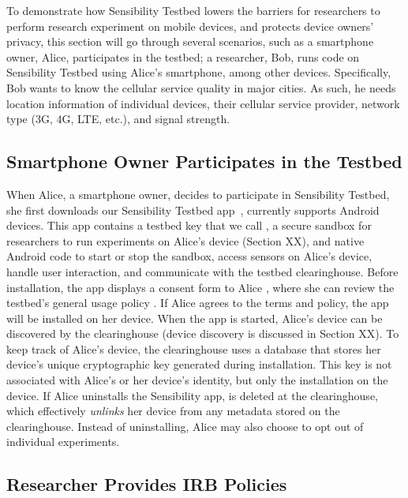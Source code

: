 To demonstrate how Sensibility Testbed lowers the barriers for
researchers to perform research experiment on mobile devices,
and protects device owners' privacy, this section will go
through several scenarios, such as a smartphone owner, Alice,
participates in the testbed; a researcher, Bob, runs code on
Sensibility Testbed using Alice's smartphone, among other
devices. Specifically, Bob wants to know the cellular service
quality in major cities. As such, he needs location information
of individual devices, their cellular service provider, network
type (3G, 4G, LTE, etc.), and signal strength.

\subsection{Smartphone Owner Participates in the Testbed}
\label{sec-owner-participate}

When Alice, a smartphone owner, decides to participate in
Sensibility Testbed, she first downloads our Sensibility Testbed
app~\cite{sensibility-app}, currently supports Android devices.
This app contains a testbed key that we call
, a secure sandbox for researchers to run
experiments on Alice's device (Section XX), and native Android
code to start or stop the sandbox, access sensors on Alice's
device, handle user interaction, and communicate with the
testbed clearinghouse. Before installation, the app displays a
consent form to Alice , where she can review
the testbed's general usage policy . If Alice
agrees to the terms and policy, the app will be installed on her
device. When the app is started, Alice's device can be
discovered by the clearinghouse (device discovery is discussed
in Section XX). To keep track of Alice's device, the
clearinghouse uses a database that stores her device's unique
cryptographic key  generated during
installation. This key is not associated with Alice's or her
device's identity, but only the installation on the device. If
Alice uninstalls the Sensibility app,  is
deleted at the clearinghouse, which effectively \textit{unlinks}
her device from any metadata stored on the clearinghouse.
Instead of uninstalling, Alice may also choose to opt out of
individual experiments.

\subsection{Researcher Provides IRB
Policies}\label{sec-irb-policy}

